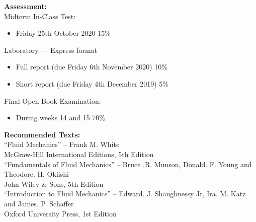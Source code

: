 \textbf{Assessment:}\\
Midterm In-Class Test:
\begin{itemize}
    \item[] Friday 25th October 2020 \hfill 15\%
\end{itemize}
Laboratory — Express format
\begin{itemize}
    \item[] Full report (due Friday 6th November 2020) \hfill10\%
    \item[] Short report (due Friday 4th December 2019) \hfill5\%
\end{itemize}
Final Open Book Examination:
\begin{itemize}
    \item[] During weeks 14 and 15 \hfill70\%
\end{itemize}
\textbf{Recommended Texts:}\\
``Fluid Mechanics'' -- Frank M. White\\
McGraw-Hill International Editions, 5th Edition\\
``Fundamentals of Fluid Mechanics'' -- Bruce .R. Munson, Donald. F. Young and Theodore. H. Okiishi\\
John Wiley \& Sons, 5th Edition\\
``Introduction to Fluid Mechanics'' -- Edward. J. Shaughnessy Jr, Ira. M. Katz and James. P. Schaffer\\
Oxford University Press, 1st Edition